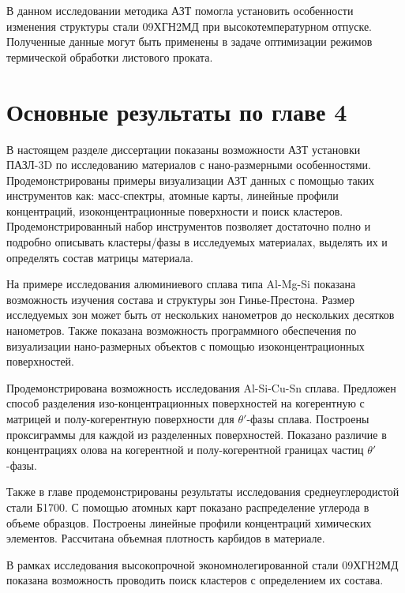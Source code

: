 В данном исследовании методика АЗТ помогла установить особенности изменения структуры стали 09ХГН2МД при высокотемпературном отпуске. Полученные данные могут быть применены в задаче оптимизации режимов термической обработки листового проката.

\FloatBarrier

\clearpage
\section{Основные результаты по главе 4}\label{sec:ch4/sect5}


В настоящем разделе диссертации показаны возможности АЗТ установки ПАЗЛ-3D по исследованию материалов с нано-размерными особенностями. Продемонстрированы примеры визуализации АЗТ данных с помощью таких инструментов как: масс-спектры, атомные карты, линейные профили концентраций, изоконцентрационные поверхности и поиск кластеров. Продемонстрированный набор инструментов позволяет достаточно полно и подробно описывать кластеры/фазы в исследуемых материалах, выделять их и определять состав матрицы материала.

На примере исследования алюминиевого сплава типа Al-Mg-Si показана возможность изучения состава и структуры зон Гинье-Престона. Размер исследуемых зон может быть от нескольких нанометров до нескольких десятков нанометров. Также показана возможность программного обеспечения по визуализации нано-размерных объектов с помощью изоконцентрационных поверхностей.

Продемонстрирована возможность исследования Al-Si-Cu-Sn сплава. Предложен способ разделения изо-концентрационных поверхностей на когерентную с матрицей и полу-когерентную поверхности для $\theta '$-фазы сплава. Построены проксиграммы для каждой из разделенных поверхностей. Показано различие в концентрациях олова на когерентной и полу-когерентной границах частиц $\theta '$-фазы.

Также в главе продемонстрированы результаты исследования среднеуглеродистой стали Б1700. С помощью атомных карт показано распределение углерода в объеме образцов. Построены линейные профили концентраций химических элементов. Рассчитана объемная плотность карбидов в материале.

В рамках исследования высокопрочной экономнолегированной стали 09ХГН2МД показана возможность проводить поиск кластеров с определением их состава.






\FloatBarrier
\clearpage


















